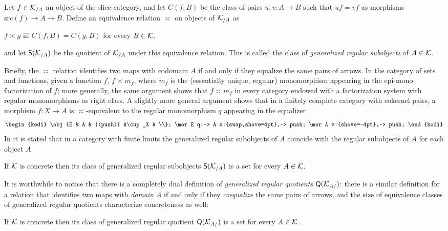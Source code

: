 \documentclass[a4paper, 10pt]{amsart}
\begin{document}
\begin{definition}\label{grsdef} Let $f\in
\mathcal{K}_{/A}$ an object of the slice category, and let $C(f,B)$ be the class of pairs
$u,v : A \to B$ such that $uf=vf$ as morphisms $\text{src}(f) \to A \to B$.
Define an equivalence relation $\asymp$ on objects of $\mathcal{K}_{/A}$ as
\begin{center}
$f\asymp g$ iff $C(f,B)=C(g,B)$ for every $B\in\mathcal{K}$, 
\end{center}
and let $\textsf{S}(\mathcal{K}_{/A})$ be the quotient of $\mathcal{K}_{/A}$ under this
equivalence relation. This is called the class of \emph{generalized regular
subobjects} of $A\in\mathcal{K}$.
\begin{remark}
Briefly, the $\asymp$ relation identifies two maps with codomain $A$ if and only if they equalize the same pairs of arrows. In the category of sets and functions, given a function $f$, $f\asymp m_f$, where $m_f$ is the (essentially unique, regular) monomorphism appearing in the epi-mono factorization of $f$; more generally, the same argument shows that $f\asymp m_f$ in every category endowed with a factorization system with regular monomorphisms as right class. A slightly more general argument shows that in a finitely complete category with cokernel pairs, a morphism $f \colon X\to A$ is $\asymp$-equivalent to the regular monomorphism $q$ appearing in the equalizer
\[\notag
\begin{kodi}
\obj{E & A & |(push)| A\cup_X A \\};
\mor E q:-> A u:{swap,shove=4pt},-> push;
\mor A v:{shove=-4pt},-> push;
\end{kodi}
\]
In \cite{freyd1973concreteness} it is stated that in a category with finite limits the generalized regular subobjects of $A$ coincide with the regular subobjects of $A$ for each object $A$.
\end{remark}
\end{definition}
\begin{proposition}\label{isbell}
If $\mathcal{K}$ is concrete then its class of generalized regular subobjects $\textsf{S}(\mathcal{K}_{/A})$ is a set for every $A\in\mathcal{K}$.
\end{proposition}
It is worthwhile to notice that there is a completely dual definition of \emph{generalized regular quotients} $\textsf{Q}(\mathcal{K}_{A/})$: there is a similar definition for a relation that identifies two maps with \emph{domain} $A$ if and only if they \emph{coequalize} the same pairs of arrows, and the size of equivalence classes of generalized regular quotients characterize concreteness as well:
\begin{proposition}\label{coisbell}
If $\mathcal{K}$ is concrete then its class of generalized regular quotient $\textsf{Q}(\mathcal{K}_{A/})$ is a set for every $A\in\mathcal{K}$.
\end{proposition}
\end{document}
